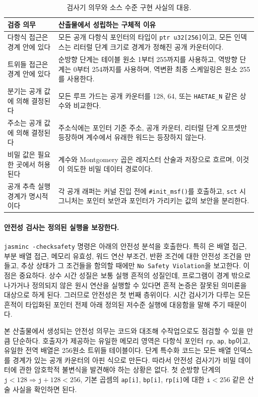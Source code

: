 \documentclass[10pt,twocolumn]{article}
\begin{document}
\begin{table}[t]
\centering
\scriptsize
\setlength{\tabcolsep}{3pt}
\begin{tabular}{P{0.34\columnwidth}P{0.56\columnwidth}}
\toprule
검증 의무 & 산출물에서 성립하는 구체적 이유 \\
\midrule
다항식 접근은 경계 안에 있다 &
모든 공개 다항식 포인터의 타입이 \texttt{ptr u32[256]}이고, 모든
인덱스는 리터럴 단계 크기로 경계가 정해진 공개 카운터이다. \\
트위들 접근은 경계 안에 있다 &
순방향 단계는 테이블 원소 1부터 255까지를 사용하고, 역방향 단계는
0부터 254까지를 사용하며, 역변환 최종 스케일링은 원소 255를 사용한다. \\
분기는 공개 값에 의해 결정된다 &
모든 루프 가드는 공개 카운터를 128, 64, 또는 \texttt{HAETAE\_N} 같은
상수와 비교한다. \\
주소는 공개 값에 의해 결정된다 &
주소식에는 포인터 기준 주소, 공개 카운터, 리터럴 단계 오프셋만
등장하며 계수에서 유래한 워드는 등장하지 않는다. \\
비밀 값은 필요한 곳에서 허용된다 &
계수와 Montgomery 곱은 레지스터 산술과 저장으로 흐르며, 이것이
의도한 비밀 데이터 경로이다. \\
공개 추측 실행 경계가 명시적이다 &
각 공개 래퍼는 커널 진입 전에 \texttt{\#init\_msf()}를 호출하고,
\texttt{sct} 시그니처는 포인터 보안과 포인터가 가리키는 값의 보안을
분리한다. \\
\bottomrule
\end{tabular}
\caption{검사기 의무와 소스 수준 구현 사실의 대응.}
\label{tab:obligations}
\end{table}

\paragraph{안전성 검사는 정의된 실행을 보장한다.}
\texttt{jasminc -checksafety} 명령은 
아래의 안전성 분석을 호출한다. 특히 은
배열 접근, 부분 배열 접근, 메모리 유효성, 워드 연산 부조건, 반환
조건에 대한 안전성 조건을 만들고, 추상 상태가 그 조건들을 함의할 때에만
\texttt{No Safety Violation}을 보고한다. 이 점은 중요하다. 상수 시간 성질은 보통
실행 흔적의 성질인데, 프로그램이 경계 밖으로 나가거나 정의되지 않은
원시 연산을 실행할 수 있다면 흔적 논증은 잘못된 의미론을 대상으로
하게 된다. 그러므로 안전성은 첫 번째 층위이다. 시간 검사기가 다루는
모든 흔적이 타입화된 포인터 전제 아래 정의된 저수준 실행에 대응함을
말해 주기 때문이다.

본 산출물에서 생성되는 안전성 의무는 코드와 대조해 수작업으로도
점검할 수 있을 만큼 단순하다. 호출자가 제공하는 유일한 메모리 영역은
다항식 포인터 \texttt{rp}, \texttt{ap}, \texttt{bp}이고, 유일한 전역
배열은 256원소 트위들 테이블이다. 단계 특수화 코드는 모든 배열
인덱스를 경계가 있는 공개 카운터의 아핀 식으로 만든다. 따라서 안전성
검사기가 비밀 데이터에 관한 암호학적 불변식을 발견해야 하는 상황은
없다. 첫 순방향 단계의
\(\texttt{j}<128 \Rightarrow \texttt{j}+128<256\), 기본 곱셈의
\texttt{ap[i]}, \texttt{bp[i]}, \texttt{rp[i]}에 대한 \(\texttt{i}<256\)
같은 산술 사실을 확인하면 된다.
\end{document}
